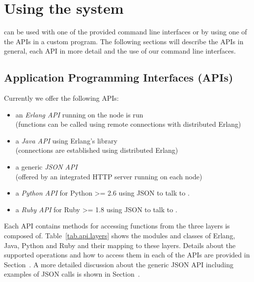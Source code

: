 \chapter{Using the system}
\label{chapter.systemuse}

\scalaris{} can be used with one of the provided command line interfaces or
by using one of the APIs in a custom program. The following sections will
describe the APIs in general, each API in more detail and the use of our
command line interfaces.

\section{Application Programming Interfaces (APIs)}
\label{chapter.systemuse.apis}

Currently we offer the following APIs:
\begin{itemize}
  \item an \emph{Erlang API} running on the node \scalaris{} is run\\
        (functions can be called using remote connections with distributed
        Erlang)
  \item a \emph{Java API} using Erlang's  library\\
        (connections are established using distributed Erlang)
  \item a generic \emph{JSON API}\\
        (offered by an integrated HTTP server running on each \scalaris{} node)
  \item a \emph{Python API} for Python >= 2.6 using JSON to talk to \scalaris{}. 
  \item a \emph{Ruby API} for Ruby >= 1.8 using JSON to talk to \scalaris{}. 
\end{itemize}

Each API contains methods for accessing functions from the three layers
\scalaris{} is composed of.
Table~\ref{tab.api.layers} shows the modules and classes of Erlang, Java, Python and Ruby
and their mapping to these layers. Details about the supported operations and
how to access them in each of the APIs are provided in
Section~. A more detailed discussion about the generic
JSON API including examples of JSON calls is shown in
Section~.

